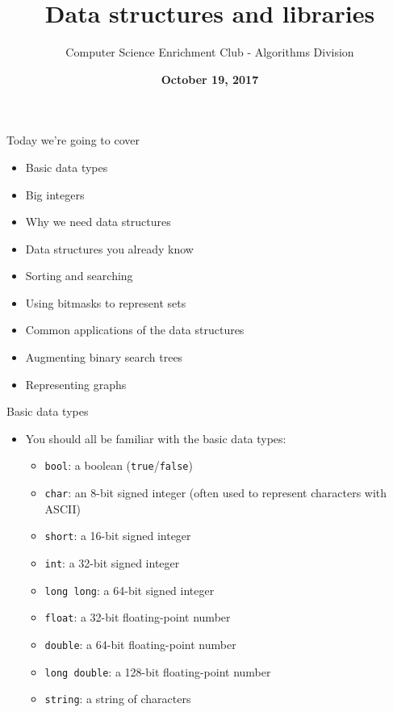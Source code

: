 \documentclass[10pt]{beamer}
\title{Data structures and libraries}
\author{Computer Science Enrichment Club - Algorithms Division}
\date{\textbf{October 19, 2017}}
\newcommand{\bi}{\begin{itemize}}
\newcommand{\ei}{\end{itemize}}
\begin{document}
\maketitle


\begin{frame}{Today we're going to cover}
    \vspace{30pt}
    \bi
        \item Basic data types
        \item Big integers
        \item Why we need data structures
        \item Data structures you already know
        \item Sorting and searching
        \item Using bitmasks to represent sets
        \item Common applications of the data structures
        \item Augmenting binary search trees
        \item Representing graphs
    \ei
\end{frame}


\begin{frame}{Basic data types}
    \bi
        \vspace{20pt}

        \item You should all be familiar with the basic data types:

        \bi
            \item \texttt{bool}: a boolean (\texttt{true}/\texttt{false})
            \vspace{5pt}
            \item \texttt{char}: an 8-bit signed integer (often used to represent characters with ASCII)
            \item \texttt{short}: a 16-bit signed integer
            \item \texttt{int}: a 32-bit signed integer
            \item \texttt{long long}: a 64-bit signed integer
            \vspace{5pt}
            \item \texttt{float}: a 32-bit floating-point number
            \item \texttt{double}: a 64-bit floating-point number
            \item \texttt{long double}: a 128-bit floating-point number
            \vspace{10pt}
            \item \texttt{string}: a string of characters
        \ei
    \ei
\end{frame}
\end{document}
